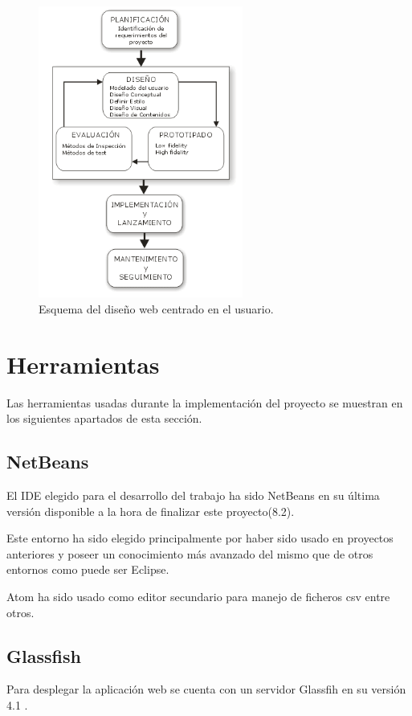 \begin{figure}[h]
  \centering
    \includegraphics[width=0.6\textwidth]{../img/dwcu/ciclo.png}
  \caption{Esquema del diseño web centrado en el usuario.}
  \label{ciclo}
\end{figure}


\section{Herramientas}
Las herramientas usadas durante la implementación del proyecto se muestran en los siguientes apartados de esta sección.

\subsection{NetBeans}
El IDE elegido para el desarrollo del trabajo ha sido NetBeans \cite{netbeans:info} en su última versión disponible a la hora de finalizar este proyecto(8.2).

Este entorno ha sido elegido principalmente por haber sido usado en proyectos anteriores y poseer un conocimiento más avanzado del mismo que de otros entornos como puede ser Eclipse.

Atom ha sido usado como editor secundario para manejo de ficheros csv entre otros.

\subsection{Glassfish}
Para desplegar la aplicación web se cuenta con un servidor Glassfih en su versión 4.1 \cite{glass:info}.

